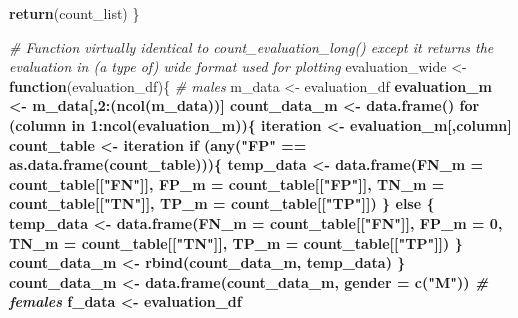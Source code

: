 \documentclass[]{article}
\newenvironment{Shaded}{\begin{snugshade}}{\end{snugshade}}
\newcommand{\KeywordTok}[1]{\textcolor[rgb]{0.13,0.29,0.53}{\textbf{#1}}}
\newcommand{\DataTypeTok}[1]{\textcolor[rgb]{0.13,0.29,0.53}{#1}}
\newcommand{\DecValTok}[1]{\textcolor[rgb]{0.00,0.00,0.81}{#1}}
\newcommand{\StringTok}[1]{\textcolor[rgb]{0.31,0.60,0.02}{#1}}
\newcommand{\CommentTok}[1]{\textcolor[rgb]{0.56,0.35,0.01}{\textit{#1}}}
\newcommand{\ControlFlowTok}[1]{\textcolor[rgb]{0.13,0.29,0.53}{\textbf{#1}}}
\newcommand{\OperatorTok}[1]{\textcolor[rgb]{0.81,0.36,0.00}{\textbf{#1}}}
\newcommand{\NormalTok}[1]{#1}
\begin{document}
\begin{Shaded}
\begin{Highlighting}[]
{{{{{{  \KeywordTok{return}\NormalTok{(count_list)}
\NormalTok{\}}


\CommentTok{# Function virtually identical to count_evaluation_long() except it returns the evaluation in (a type of) wide format used for plotting}
\NormalTok{evaluation_wide <-}\StringTok{ }\ControlFlowTok{function}\NormalTok{(evaluation_df)\{}
  \CommentTok{# males}
\NormalTok{  m_data <-}\StringTok{ }\NormalTok{evaluation_df }\OperatorTok{%>%}\StringTok{ }\KeywordTok{filter}\NormalTok{(gender }\OperatorTok{==}\StringTok{ "M"}\NormalTok{)}
\NormalTok{  evaluation_m <-}\StringTok{ }\NormalTok{m_data[,}\DecValTok{2}\OperatorTok{:}\NormalTok{(}\KeywordTok{ncol}\NormalTok{(m_data))]}
\NormalTok{  count_data_m <-}\StringTok{ }\KeywordTok{data.frame}\NormalTok{()}
  \ControlFlowTok{for}\NormalTok{ (column }\ControlFlowTok{in} \DecValTok{1}\OperatorTok{:}\KeywordTok{ncol}\NormalTok{(evaluation_m))\{}
\NormalTok{    iteration <-}\StringTok{ }\NormalTok{evaluation_m[,column]}
\NormalTok{    count_table <-}\StringTok{ }\NormalTok{iteration }\OperatorTok{%>%}\StringTok{ }\KeywordTok{unlist}\NormalTok{() }\OperatorTok{%>%}\StringTok{ }\KeywordTok{table}\NormalTok{()}
    \ControlFlowTok{if}\NormalTok{ (}\KeywordTok{any}\NormalTok{(}\StringTok{"FP"} \OperatorTok{==}\StringTok{ }\KeywordTok{as.data.frame}\NormalTok{(count_table)))\{}
\NormalTok{      temp_data <-}\StringTok{ }\KeywordTok{data.frame}\NormalTok{(}\DataTypeTok{FN_m =}\NormalTok{ count_table[[}\StringTok{"FN"}\NormalTok{]], }\DataTypeTok{FP_m =}\NormalTok{ count_table[[}\StringTok{"FP"}\NormalTok{]], }\DataTypeTok{TN_m =}\NormalTok{ count_table[[}\StringTok{"TN"}\NormalTok{]], }\DataTypeTok{TP_m =}\NormalTok{ count_table[[}\StringTok{"TP"}\NormalTok{]])}
\NormalTok{    \}}
    \ControlFlowTok{else}\NormalTok{ \{}
\NormalTok{      temp_data <-}\StringTok{ }\KeywordTok{data.frame}\NormalTok{(}\DataTypeTok{FN_m =}\NormalTok{ count_table[[}\StringTok{"FN"}\NormalTok{]], }\DataTypeTok{FP_m =} \DecValTok{0}\NormalTok{, }\DataTypeTok{TN_m =}\NormalTok{ count_table[[}\StringTok{"TN"}\NormalTok{]], }\DataTypeTok{TP_m =}\NormalTok{ count_table[[}\StringTok{"TP"}\NormalTok{]])}
\NormalTok{    \}}
\NormalTok{    count_data_m <-}\StringTok{ }\KeywordTok{rbind}\NormalTok{(count_data_m, temp_data)}
\NormalTok{  \}}
\NormalTok{  count_data_m <-}\StringTok{ }\KeywordTok{data.frame}\NormalTok{(count_data_m, }\DataTypeTok{gender =} \KeywordTok{c}\NormalTok{(}\StringTok{"M"}\NormalTok{))}
  \CommentTok{# females}
\NormalTok{  f_data <-}\StringTok{ }\NormalTok{evaluation_df }\OperatorTok{%>%}\StringTok{ }\KeywordTok{filter}\NormalTok{(gender }\OperatorTok{==}\StringTok{ "F"}\NormalTok{)}
}}}}}}}}}
\end{Highlighting}
\end{Shaded}
\end{document}
